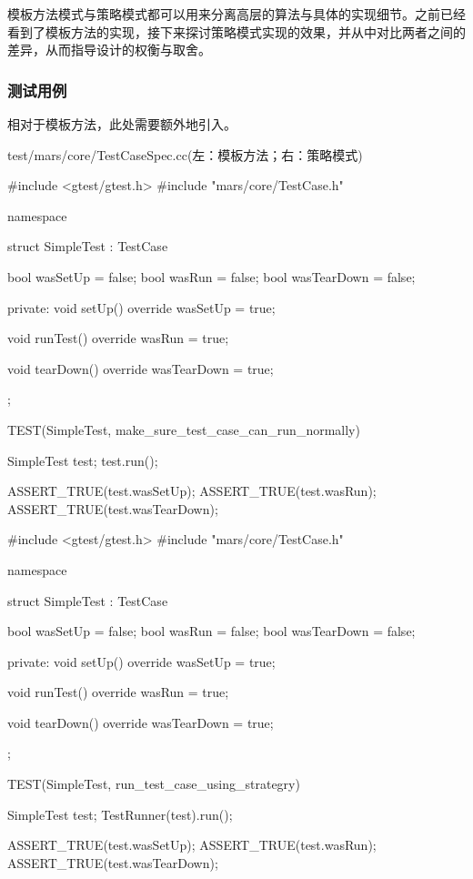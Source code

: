 \begin{content}

模板方法模式与策略模式都可以用来分离高层的算法与具体的实现细节。之前已经看到了模板方法的实现，接下来探讨策略模式实现的效果，并从中对比两者之间的差异，从而指导设计的权衡与取舍。

\subsubsection{测试用例}

相对于模板方法，此处需要额外地引入。

\begin{diff}{test/mars/core/TestCaseSpec.cc(左：模板方法；右：策略模式)}
 \begin{minicpp}
#include <gtest/gtest.h>
#include "mars/core/TestCase.h"

namespace {
  struct SimpleTest : TestCase {
    bool wasSetUp = false;
    bool wasRun = false;
    bool wasTearDown = false;

  private:
    void setUp() override {
      wasSetUp = true;
    }

    void runTest() override {
      wasRun = true;
    }

    void tearDown() override {
      wasTearDown = true;
    }
  };
}

TEST(SimpleTest, make_sure_test_case_can_run_normally) {
  SimpleTest test;
  test.run();

  ASSERT_TRUE(test.wasSetUp);
  ASSERT_TRUE(test.wasRun);
  ASSERT_TRUE(test.wasTearDown);  
} \end{minicpp}
\tcblower
 \begin{minicpp}
#include <gtest/gtest.h>
#include "mars/core/TestCase.h"

namespace {
  struct SimpleTest : TestCase {
    bool wasSetUp = false;
    bool wasRun = false;
    bool wasTearDown = false;

  private:
    void setUp() override {
      wasSetUp = true;
    }

    void runTest() override {
      wasRun = true;
    }

    void tearDown() override {
      wasTearDown = true;
    }
  };
}

TEST(SimpleTest, run_test_case_using_strategry) {
  SimpleTest test;
  TestRunner(test).run();

  ASSERT_TRUE(test.wasSetUp);
  ASSERT_TRUE(test.wasRun);
  ASSERT_TRUE(test.wasTearDown);  
}
 \end{minicpp} 
\end{diff}


\end{content}
